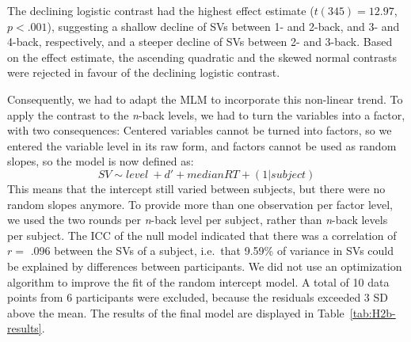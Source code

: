 \documentclass[
  man,floatsintext]{apa6}
\begin{document}
The declining logistic contrast had the highest effect estimate (\(t(345) = 12.97\), \(p < .001\)), suggesting a shallow decline of SVs between 1- and 2-back, and 3- and 4-back, respectively, and a steeper decline of SVs between 2- and 3-back.
Based on the effect estimate, the ascending quadratic and the skewed normal contrasts were rejected in favour of the declining logistic contrast.

Consequently, we had to adapt the MLM to incorporate this non-linear trend.
To apply the contrast to the \emph{n}-back levels, we had to turn the variables into a factor, with two consequences:
Centered variables cannot be turned into factors, so we entered the variable level in its raw form, and factors cannot be used as random slopes, so the model is now defined as:
\[
SV \sim level\ + d' + median RT + (1|subject)
\]
This means that the intercept still varied between subjects, but there were no random slopes anymore.
To provide more than one observation per factor level, we used the two rounds per \emph{n}-back level per subject, rather than \emph{n}-back levels per subject.
The ICC of the null model indicated that there was a correlation of \(r=\) .096 between the SVs of a subject, i.e.~that 9.59\% of variance in SVs could be explained by differences between participants.
We did not use an optimization algorithm to improve the fit of the random intercept model.
A total of 10 data points from 6 participants were excluded, because the residuals exceeded 3 SD above the mean.
The results of the final model are displayed in Table~\ref{tab:H2b-results}.
\end{document}
